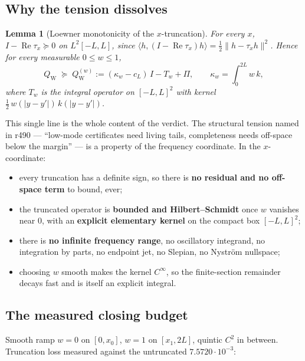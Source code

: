 \documentclass[11pt]{article}
\newtheorem{lemma}{Lemma}
\theoremstyle{remark}
\newcommand{\QW}{Q_{\mathrm W}}
\begin{document}
\subsection{Why the tension dissolves}

\begin{lemma}[Loewner monotonicity of the $x$-truncation]
\label{lem:loewner}
For every $x$, $I-\operatorname{Re}\tau_x\succeq0$ on
$L^2[-L,L]$, since
$\langle h,(I-\operatorname{Re}\tau_x)h\rangle
=\tfrac12\|h-\tau_xh\|^2$.
Hence for every measurable $0\le w\le1$,
\[
  \QW\;\succeq\;\QW^{(w)}
  :=(\kappa_w-c_L)\,I-T_w+\Pi,\qquad
  \kappa_w=\int_0^{2L}w\,k ,
\]
where $T_w$ is the integral operator on $[-L,L]^2$ with kernel
$\tfrac12\,w(|y-y'|)\,k(|y-y'|)$.
\end{lemma}

This single line is the whole content of the verdict.
The structural tension named in r490 --- ``low-mode
certificates need living tails, completeness needs off-space
below the margin'' --- is a property of the frequency
coordinate.  In the $x$-coordinate:

\begin{itemize}
\item every truncation has a definite sign, so there is
\textbf{no residual and no off-space term} to bound, ever;
\item the truncated operator is \textbf{bounded and
Hilbert--Schmidt} once $w$ vanishes near $0$, with an
\textbf{explicit elementary kernel} on the compact box
$[-L,L]^2$;
\item there is \textbf{no infinite frequency range}, no
oscillatory integrand, no integration by parts, no endpoint
jet, no Slepian, no Nystr\"om nullspace;
\item choosing $w$ smooth makes the kernel $C^\infty$, so the
finite-section remainder decays fast and is itself an explicit
integral.
\end{itemize}

\subsection{The measured closing budget}

Smooth ramp $w=0$ on $[0,x_0]$, $w=1$ on $[x_1,2L]$, quintic
$C^2$ in between.  Truncation loss measured against the
untruncated $7.5720\cdot10^{-3}$:
\end{document}

